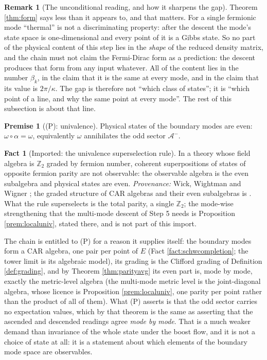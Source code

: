 \documentclass[11pt]{article}
\theoremstyle{definition}
\newtheorem{remark}[theorem]{Remark}
\newtheorem{premise}[theorem]{Premise}
\newtheorem{fact}[theorem]{Fact}
\newcommand{\Aod}{\mathcal{A}^{-}}
\begin{document}
\begin{remark}[The unconditional reading, and how it sharpens the gap]\label{rem:honest}
Theorem \ref{thm:form} says less than it appears to, and that matters. For a single fermionic mode ``thermal'' is not a discriminating property: after the descent the mode's state space is one-dimensional and every point of it is a Gibbs state. So no part of the physical content of this step lies in the \emph{shape} of the reduced density matrix, and the chain must not claim the Fermi-Dirac form as a prediction: the descent produces that form from any input whatever. All of the content lies in the number $\beta_k$, in the claim that it is the same at every mode, and in the claim that its value is $2\pi/\kappa$. The gap is therefore not ``which class of states''; it is ``which point of a line, and why the same point at every mode''. The rest of this subsection is about that line.
\end{remark}

\begin{premise}[(P): univalence]\label{prem:parity}
Physical states of the boundary modes are even: $\omega \circ \alpha = \omega$, equivalently $\omega$ annihilates the odd sector $\Aod$.
\end{premise}

\begin{fact}[Imported: the univalence superselection rule]\label{fact:www}
In a theory whose field algebra is $\mathbb{Z}_2$ graded by fermion number, coherent superpositions of states of opposite fermion parity are not observable: the observable algebra is the even subalgebra and physical states are even. \emph{Provenance:} Wick, Wightman and Wigner \cite{WWW1952}; the graded structure of CAR algebras and their even subalgebras is \cite[\S 5.2]{BR2}. What the rule superselects is the total parity, a single $\mathbb{Z}_2$; the mode-wise strengthening that the multi-mode descent of Step 5 needs is Proposition \ref{prem:localuniv}, stated there, and is not part of this import.
\end{fact}

The chain is entitled to (P) for a reason it supplies itself: the boundary modes form a CAR algebra, one pair per point of $E$ (Fact \ref{fact:schwcompletion}; the tower limit \cite[Thm.~5.6]{ButlerT3} is its algebraic model), its grading is the Clifford grading of Definition \ref{def:grading}, and by Theorem \ref{thm:parityavg} its even part is, mode by mode, exactly the metric-level algebra (the multi-mode metric level is the joint-diagonal algebra, whose licence is Proposition \ref{prem:localuniv}, one parity per point rather than the product of all of them). What (P) asserts is that the odd sector carries no expectation values, which by that theorem is the same as asserting that the ascended and descended readings agree \emph{mode by mode}. That is a much weaker demand than invariance of the whole state under the boost flow, and it is not a choice of state at all: it is a statement about which elements of the boundary mode space are observables.
\end{document}
